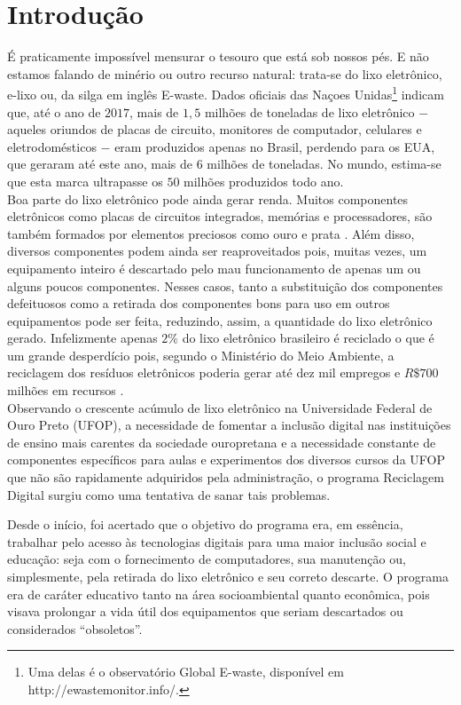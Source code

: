 \documentclass[a4paper]{ifacconf}
\begin{document}
\section{Introdução}


É praticamente impossível mensurar o tesouro que está sob nossos pés. E não estamos falando de minério ou outro recurso natural: trata-se do lixo eletrônico, e-lixo ou, da silga em inglês E-waste. Dados oficiais das Naçoes Unidas\footnote{Uma delas é o observatório Global E-waste, disponível em {http://ewastemonitor.info/}.} indicam que, até o ano de $2017$, mais de $1,5$ milhões de toneladas de lixo eletrônico $-$ aqueles oriundos de placas de circuito, monitores de computador, celulares e eletrodomésticos  $-$ eram produzidos apenas no Brasil, perdendo para os EUA, que geraram até este ano, mais de $6$ milhões de toneladas. No mundo, estima-se que esta marca ultrapasse os $50$ milhões produzidos todo ano.\\

Boa parte do lixo eletrônico pode ainda gerar renda. Muitos componentes eletrônicos como placas de circuitos integrados, memórias e processadores, são também formados por elementos preciosos como ouro e prata \citep{Salviato}. Além disso, diversos componentes podem ainda ser reaproveitados pois, muitas vezes, um equipamento inteiro é descartado pelo mau funcionamento de apenas um ou alguns poucos componentes. Nesses casos, tanto a substituição dos componentes defeituosos como a retirada dos componentes bons para uso em outros equipamentos pode ser feita, reduzindo, assim, a quantidade do lixo eletrônico gerado. Infelizmente apenas $2\%$ do lixo eletrônico brasileiro é reciclado o que é um grande desperdício pois, segundo o Ministério do Meio Ambiente, a reciclagem dos resíduos eletrônicos poderia gerar até dez mil empregos e $R\$700$ milhões em recursos \citep{Salviato}. \\

Observando o crescente acúmulo de lixo eletrônico na Universidade Federal de Ouro Preto (UFOP), a necessidade de fomentar a inclusão digital nas instituições de ensino mais carentes da sociedade ouropretana e a necessidade constante de componentes específicos para aulas e experimentos dos diversos cursos da UFOP que não são rapidamente adquiridos pela administração, o programa Reciclagem Digital surgiu como uma tentativa de sanar tais problemas.

Desde o início, foi acertado que o objetivo do programa era, em essência, trabalhar pelo acesso às tecnologias digitais para uma maior inclusão social e educação: seja com o fornecimento de computadores, sua manutenção ou, simplesmente, pela retirada do lixo eletrônico e seu correto descarte. O programa era de caráter educativo tanto na área socioambiental quanto econômica, pois visava prolongar a vida útil dos equipamentos que seriam descartados ou considerados ``obsoletos''.\\
\end{document}
